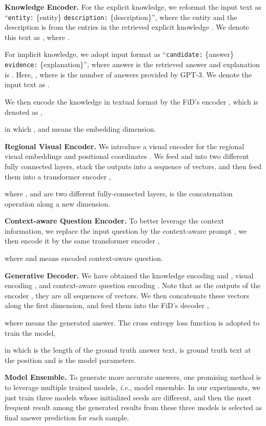 \documentclass{article}
\begin{document}
\textbf{Knowledge Encoder. } For the explicit knowledge, we reformat the input text as ``\texttt{entity:} \{entity\} \texttt{description:} \{description\}'', where the entity and the description is from the entries in the retrieved explicit knowledge . We denote this text as , where . 

For implicit knowledge, we adopt input format as ``\texttt{candidate:} \{answer\} \texttt{evidence:} \{explanation\}'', where answer is the retrieved answer  and explanation is . Here, , where  is the number of answers provided by GPT-3. We denote the input text as .

We then encode the knowledge in textual format by the FiD's encoder \cite{vaswani2017attention}, which is denoted as ,

in which ,  and  means the embedding dimension.

\textbf{Regional Visual Encoder. } We introduce a visual encoder for the regional visual embeddings  and positional coordinates . We feed  and  into two different fully connected layers, stack the outputs into a sequence of vectors, and then feed them into a transformer encoder ,
	
where ,  and  are two different fully-connected layers,  is the concatenation operation along a new dimension.

\textbf{Context-aware Question Encoder. } To better leverage the context information, we replace the input question  by the context-aware prompt , we then encode it by the same transformer encoder ,

where  and  means encoded context-aware question.

\textbf{Generative Decoder. } We have obtained the knowledge encoding  and , visual encoding , and context-aware question encoding . Note that as the outputs of the encoder , they are all sequences of vectors. We then concatenate these vectors along the first dimension, and feed them into the FiD's decoder ,

where  means the generated answer. The cross entropy loss function is adopted to train the model,
	
in which  is the length of the ground truth answer text,  is ground truth text at the position  and  is the model parameters.

\textbf{Model Ensemble. } To generate more accurate answers, one promising method is to leverage multiple trained models, \textit{i.e.}, model ensemble. In our experiments, we just train three models whose initialized seeds are different, and then the most frequent result among the generated results from these three models is selected as final answer prediction for each sample.
\end{document}
